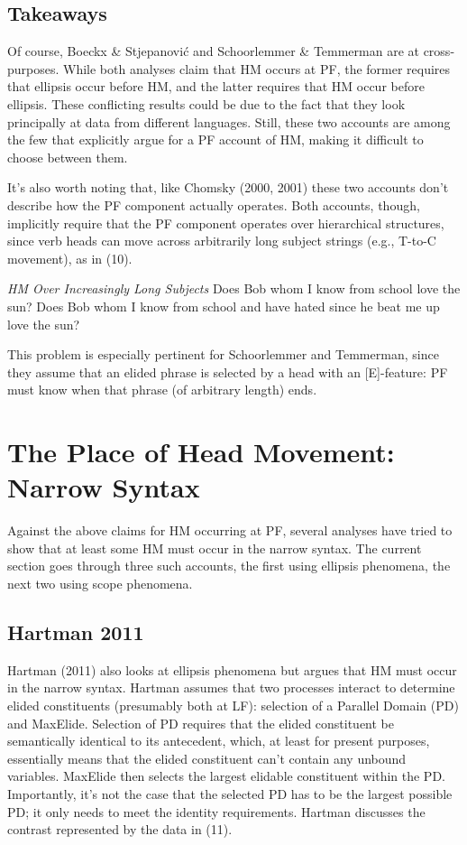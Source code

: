\documentclass[]{ling-200b-2}
\begin{document}
\subsection{Takeaways}

Of course, Boeckx \& Stjepanović and Schoorlemmer \& Temmerman are at cross-purposes. While both analyses claim that HM occurs at PF, the former requires that ellipsis occur before HM, and the latter requires that HM occur before ellipsis. These conflicting results could be due to the fact that they look principally at data from different languages. Still, these two accounts are among the few that explicitly argue for a PF account of HM, making it difficult to choose between them.

It's also worth noting that, like Chomsky (2000, 2001) these two accounts don't describe how the PF component actually operates. Both accounts, though, implicitly require that the PF component operates over hierarchical structures, since verb heads can move across arbitrarily long subject strings (e.g., T-to-C movement), as in (10).

\pex \textit{HM Over Increasingly Long Subjects}
\a Does Bob whom I know from school love the sun?
\a Does Bob whom I know from school and have hated since he beat me up love the sun?
\xe

\noindent This problem is especially pertinent for Schoorlemmer and Temmerman, since they assume that an elided phrase is selected by a head with an [E]-feature: PF must know when that phrase (of arbitrary length) ends.

\section{The Place of Head Movement: Narrow Syntax}

Against the above claims for HM occurring at PF, several analyses have tried to show that at least some HM must occur in the narrow syntax. The current section goes through three such accounts, the first using ellipsis phenomena, the next two using scope phenomena.

\subsection{Hartman 2011}

Hartman (2011) also looks at ellipsis phenomena but argues that HM must occur in the narrow syntax. Hartman assumes that two processes interact to determine elided constituents (presumably both at LF): selection of a Parallel Domain (PD) and MaxElide. Selection of PD requires that the elided constituent be semantically identical to its antecedent, which, at least for present purposes, essentially means that the elided constituent can't contain any unbound variables. MaxElide then selects the largest elidable constituent within the PD. Importantly, it's not the case that the selected PD has to be the largest possible PD; it only needs to meet the identity requirements. Hartman discusses the contrast represented by the data in (11).
\end{document}
